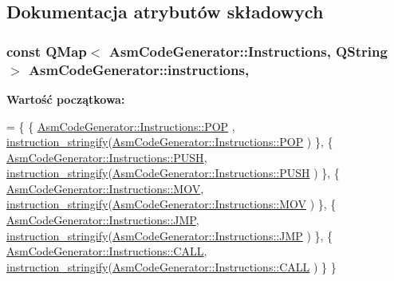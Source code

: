 \subsection{Dokumentacja atrybutów składowych}
\hypertarget{class_asm_code_generator_ab017616dbde9a998807080cbc0bff89a}{
\subsubsection[{instructions}]{\setlength{\rightskip}{0pt plus 5cm}const Q\-Map$<$ {\bf Asm\-Code\-Generator\-::\-Instructions}, Q\-String $>$ Asm\-Code\-Generator\-::instructions\hspace{0.3cm}{\ttfamily [static]}, {\ttfamily [private]}}}\label{class_asm_code_generator_ab017616dbde9a998807080cbc0bff89a}
{\bfseries Wartość początkowa\-:}
\begin{DoxyCode}
= \{
    \{ \hyperlink{class_asm_code_generator_a975bb037f383eb14e8f21acc7c4cd9a8aefdb39a4c7286afcecf0e8a7435fce6a}{AsmCodeGenerator::Instructions::POP} , 
      \hyperlink{daddingmethods_8h_a2dffee0b2992c6276c96aaa4ca719a21}{instruction\_stringify}(\hyperlink{class_asm_code_generator_a975bb037f383eb14e8f21acc7c4cd9a8aefdb39a4c7286afcecf0e8a7435fce6a}{AsmCodeGenerator::Instructions::POP}
      )  \},
    \{ \hyperlink{class_asm_code_generator_a975bb037f383eb14e8f21acc7c4cd9a8a73dabe4437725eedc05a1824a2c31550}{AsmCodeGenerator::Instructions::PUSH}, 
      \hyperlink{daddingmethods_8h_a2dffee0b2992c6276c96aaa4ca719a21}{instruction\_stringify}(\hyperlink{class_asm_code_generator_a975bb037f383eb14e8f21acc7c4cd9a8a73dabe4437725eedc05a1824a2c31550}{AsmCodeGenerator::Instructions::PUSH}
      ) \},
    \{ \hyperlink{class_asm_code_generator_a975bb037f383eb14e8f21acc7c4cd9a8a17b32100aef1fc19670be7fd58bc85df}{AsmCodeGenerator::Instructions::MOV},  
      \hyperlink{daddingmethods_8h_a2dffee0b2992c6276c96aaa4ca719a21}{instruction\_stringify}(\hyperlink{class_asm_code_generator_a975bb037f383eb14e8f21acc7c4cd9a8a17b32100aef1fc19670be7fd58bc85df}{AsmCodeGenerator::Instructions::MOV}
      )  \},
    \{ \hyperlink{class_asm_code_generator_a975bb037f383eb14e8f21acc7c4cd9a8a152b9af76a9e7dd95d9da277b69fdd95}{AsmCodeGenerator::Instructions::JMP},  
      \hyperlink{daddingmethods_8h_a2dffee0b2992c6276c96aaa4ca719a21}{instruction\_stringify}(\hyperlink{class_asm_code_generator_a975bb037f383eb14e8f21acc7c4cd9a8a152b9af76a9e7dd95d9da277b69fdd95}{AsmCodeGenerator::Instructions::JMP}
      )  \},
    \{ \hyperlink{class_asm_code_generator_a975bb037f383eb14e8f21acc7c4cd9a8aca3547acb9162b49fb4a6594ed9b3030}{AsmCodeGenerator::Instructions::CALL}, 
      \hyperlink{daddingmethods_8h_a2dffee0b2992c6276c96aaa4ca719a21}{instruction\_stringify}(\hyperlink{class_asm_code_generator_a975bb037f383eb14e8f21acc7c4cd9a8aca3547acb9162b49fb4a6594ed9b3030}{AsmCodeGenerator::Instructions::CALL}
      ) \}
\}
\end{DoxyCode}



